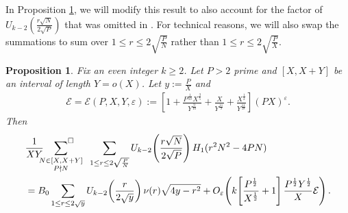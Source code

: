 \documentclass[12pt,letterpaper,reqno]{amsart}
\theoremstyle{plain}
\newtheorem{proposition}[theorem]{Proposition}
\theoremstyle{definition}
\numberwithin{equation}{section}
\numberwithin{figure}{section}
\numberwithin{table}{section}
\newcommand{\lrp}[1]{\!\left(#1\right)}
\newcommand{\lrb}[1]{\!\left[#1\right]}
\newcommand{\EE}{\mathcal{E}}
\begin{document}
In Proposition \ref{prop:main-proposition}, we will modify this result to 
also account for the factor of $U_{k-2}\lrp{\frac{r\sqrt{N}}{2\sqrt{P}}}$ that was omitted in \cite{Zubrilina}.
For technical reasons, we will also swap the summations to sum over $1 \le r \le 2\sqrt{\frac{P}{N}}$ rather than $1 \le r \le 2\sqrt{\frac{P}{X}}$. 
\begin{proposition} \label{prop:main-proposition}
    Fix an even integer $k\ge2$.
    Let $P>2$ prime and $[X,X+Y]$ be an interval of length $Y=o(X)$. Let $y:= \frac{P}{X}$ and
    \begin{align}  
        \EE = \EE(P,X,Y,\varepsilon) :=
        \lrb{
            1 
            + 
            \frac{
                P^\frac{1}{10} X^\frac{3}{5} 
            }{
                Y^\frac{9}{10}
            }
            +
            \frac{X}{Y^\frac{11}{9}}
            +
            \frac{X^\frac{1}{2}}{Y^\frac{11}{18}}
        }
        (PX)^\varepsilon.
    \end{align}
    Then 
    \begin{align}\label{eq:main-prop-LHS}
       &\frac{1}{XY} 
       \sideset{}{^\square}\sum_{\substack{N\in[X,X+Y] \\ P\nmid N}}
       \hspace{2mm}
       \sum_{1\leq r \leq 2\sqrt{\frac{P}{N}}} U_{k-2}\lrp{\frac{r\sqrt{N}}{2\sqrt{P}}} H_1(r^2N^2-4PN) \\
       &= B_0\sum_{1\leq r\leq 2\sqrt{y}}U_{k-2}\lrp{\frac{r}{2\sqrt{y}}}\nu(r)\sqrt{4y-r^2} 
       +
       O_\varepsilon\lrp{ k
        \lrb{
            \frac{P^\frac{1}{2}}{X^\frac{1}{2}}
            + 1
        }
        \frac{P^\frac{1}{2} Y^\frac{1}{2}}{X}
        \EE
       }.
       \label{eqn:main-prop-error-term}
    \end{align}
\end{proposition}
\end{document}
